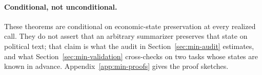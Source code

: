 \paragraph{Conditional, not unconditional.}
These theorems are conditional on economic-state preservation at every
realized call. They do not assert that an arbitrary summarizer
preserves that state on political text; that claim is what the audit
in Section~\ref{sec:min-audit} estimates, and what
Section~\ref{sec:min-validation} cross-checks on two tasks whose
states are known in advance. Appendix~\ref{app:min-proofs} gives the
proof sketches.
